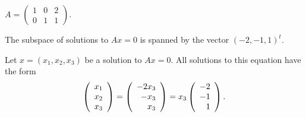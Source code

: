 \documentclass{ximera}
\begin{document}
\begin{exercise} \label{c5.2.2c}
$A = \left(\begin{array}{rrr} 1 & 0 & 2 \\
        0 & 1 & 1\end{array}\right)$.

\begin{solution}

\ans The subspace of solutions to $Ax = 0$ is spanned by the vector
$(-2,-1,1)^t$.

\soln Let $x = (x_1,x_2,x_3)$ be a solution to $Ax = 0$.  All solutions
to this equation have the form
\[
\left(\begin{array}{r} x_1 \\ x_2 \\ x_3\end{array}\right) = \left(\begin{array}{r} -2x_3 \\ -x_3 \\ x_3\end{array}\right) =
x_3\left(\begin{array}{r} -2 \\ -1 \\ 1\end{array}\right).
\]

\end{solution}
\end{exercise}
\end{document}

